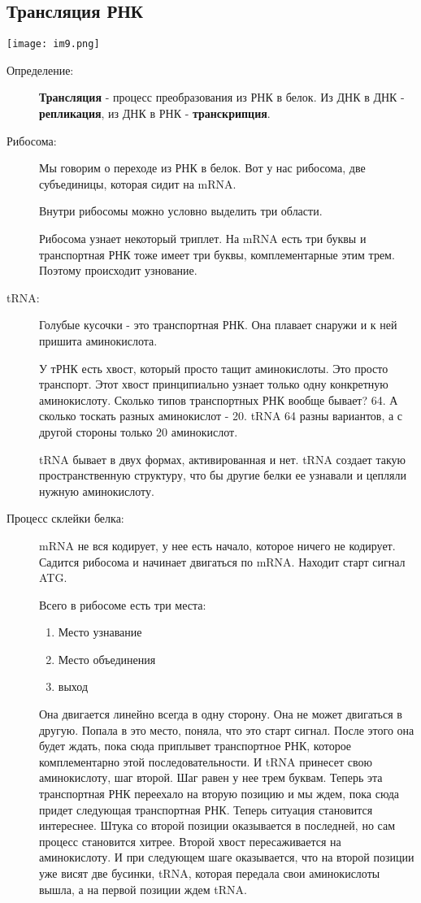\subsection{Трансляция РНК}
\texttt{[image: im9.png]}
\begin{description}
\item[Определение:]
    \textbf{Трансляция} - процесс преобразования из РНК в белок. Из 
    ДНК в ДНК - \textbf{репликация}, из ДНК в РНК - \textbf{транскрипция}.

\item[Рибосома:]
Мы говорим о переходе из РНК в белок. 
Вот у нас рибосома, две субъединицы, которая сидит на mRNA. 

Внутри рибосомы можно условно выделить три области.

Рибосома узнает некоторый триплет. На mRNA есть три буквы и транспортная РНК тоже имеет
три буквы, комплементарные этим трем. Поэтому происходит узнование.

\item[tRNA:]
Голубые кусочки - это транспортная РНК. 
Она плавает снаружи и к ней пришита аминокислота. 

У тРНК есть хвост, который просто тащит аминокислоты. Это просто транспорт. Этот
хвост принципиально узнает только одну конкретную аминокислоту. Сколько типов
транспортных РНК вообще бывает? 64. А сколько тоскать разных аминокислот - 20.
tRNA 64 разны вариантов, а с другой стороны только 20 аминокислот.

tRNA бывает в двух формах, активированная и нет. tRNA создает такую пространственную
структуру, что бы другие белки ее узнавали и цепляли нужную аминокислоту.

\item[Процесс склейки белка:]
mRNA не вся кодирует, у нее есть начало, которое ничего не кодирует. Садится рибосома и
начинает двигаться по mRNA. Находит старт сигнал ATG. 

Всего в рибосоме есть три места:
\begin{enumerate}
\item Место узнавание 
\item Место объединения 
\item выход
\end{enumerate} 

Она двигается линейно всегда в одну сторону.
Она не может двигаться в другую. Попала в это место, поняла, что 
это старт сигнал. После этого она будет ждать, пока 
сюда приплывет транспортное РНК, которое комплементарно этой последовательности. 
И tRNA принесет свою аминокислоту, шаг второй. Шаг равен у нее трем буквам. Теперь эта 
транспортная РНК переехало на вторую позицию и мы ждем, пока сюда придет следующая 
транспортная РНК. Теперь ситуация становится интереснее. Штука со второй позиции оказывается 
в последней, но сам процесс становится хитрее. Второй хвост пересаживается на аминокислоту. 
И при следующем шаге оказывается, что на второй позиции уже висят две бусинки, tRNA, которая 
передала свои аминокислоты вышла, а на первой позиции ждем tRNA.

\end{description}
